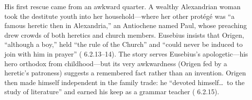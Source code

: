 His first rescue came from an awkward quarter. A wealthy Alexandrian woman
took the destitute youth into her household---where her other protégé was
``a famous heretic then in Alexandria,'' an Antiochene named Paul, whose
preaching drew crowds of both heretics and church members. Eusebius insists
that Origen, ``although a boy,'' held ``the rule of the Church'' and ``could
never be induced to join with him in prayer'' (
6.2.13--14). The story serves Eusebius's apologetic---his hero orthodox from
childhood---but its very awkwardness (Origen fed by a heretic's patroness)
suggests a remembered fact rather than an invention. Origen then made
himself independent in the family trade: he ``devoted himself\ldots\ to the
study of literature'' and earned his keep as a grammar teacher ( 6.2.15).
